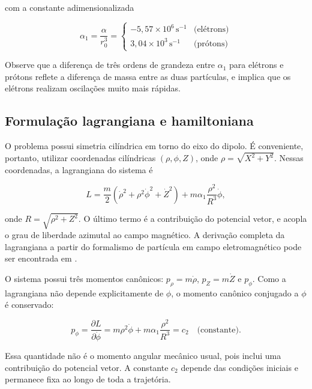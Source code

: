 \documentclass[twocolumn]{rbef}
\begin{document}
\noindent com a constante adimensionalizada

\begin{equation}
    \alpha_1 = \dfrac{\alpha}{r_0^3} = \begin{cases}
                -5{,}57 \times 10^{6}\,\text{s}^{-1} & \textrm{(elétrons)}\\[4pt]
                3{,}04 \times 10^{3}\,\text{s}^{-1} & \textrm{(prótons)}
            \end{cases}
\end{equation}

Observe que a diferença de três ordens de grandeza entre $\alpha_1$ para elétrons e prótons reflete a diferença de massa entre as duas partículas, e implica que os elétrons realizam oscilações muito mais rápidas.

\subsection{Formulação lagrangiana e hamiltoniana}

O problema possui simetria cilíndrica em torno do eixo do dipolo. É conveniente, portanto, utilizar coordenadas cilíndricas $(\rho, \phi, Z)$, onde $\rho = \sqrt{X^2 + Y^2}$. Nessas coordenadas, a lagrangiana do sistema é

\begin{equation}\label{lagrangiana}
    L = \dfrac{m}{2}\left(\dot{\rho}^2 + \rho^2\dot{\phi}^2 + \dot{Z}^2\right) + m\alpha_1\dfrac{\rho^2}{R^3}\dot{\phi},
\end{equation}

\noindent onde $R = \sqrt{\rho^2 + Z^2}$. O último termo é a contribuição do potencial vetor, e acopla o grau de liberdade azimutal ao campo magnético. A derivação completa da lagrangiana a partir do formalismo de partícula em campo eletromagnético pode ser encontrada em \cite{Goldstein, Taylor}.

O sistema possui três momentos canônicos: $p_\rho = m\dot{\rho}$, $p_Z = m\dot{Z}$ e $p_\phi$. Como a lagrangiana não depende explicitamente de $\phi$, o momento canônico conjugado a $\phi$ é conservado:

\begin{equation}\label{momentoAngular}
    p_\phi = \dfrac{\partial L}{\partial \dot{\phi}} = m\rho^2\dot{\phi} + m\alpha_1\dfrac{\rho^2}{R^3} = c_2 \quad \textrm{(constante)}.
\end{equation}

Essa quantidade não é o momento angular mecânico usual, pois inclui uma contribuição do potencial vetor. A constante $c_2$ depende das condições iniciais e permanece fixa ao longo de toda a trajetória.
\end{document}
